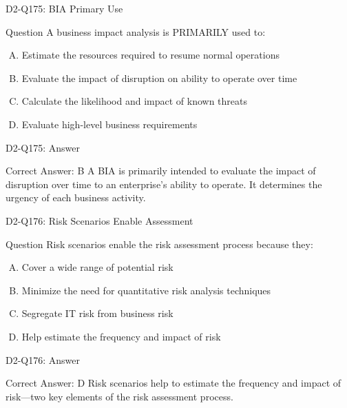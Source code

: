 \documentclass{beamer}
\begin{document}
	\begin{frame}{D2-Q175: BIA Primary Use}
		\begin{block}{Question}
			A business impact analysis is PRIMARILY used to:
		\end{block}
		\begin{enumerate}[(A)]
			\item Estimate the resources required to resume normal operations
			\item Evaluate the impact of disruption on ability to operate over time
			\item Calculate the likelihood and impact of known threats
			\item Evaluate high-level business requirements
		\end{enumerate}
	\end{frame}
	\begin{frame}{D2-Q175: Answer}
		\begin{block}{Correct Answer: B}
			A BIA is primarily intended to evaluate the impact of disruption over time to an enterprise's ability to operate. It determines the urgency of each business activity.
		\end{block}
	\end{frame}
	
	\begin{frame}{D2-Q176: Risk Scenarios Enable Assessment}
		\begin{block}{Question}
			Risk scenarios enable the risk assessment process because they:
		\end{block}
		\begin{enumerate}[(A)]
			\item Cover a wide range of potential risk
			\item Minimize the need for quantitative risk analysis techniques
			\item Segregate IT risk from business risk
			\item Help estimate the frequency and impact of risk
		\end{enumerate}
	\end{frame}
	\begin{frame}{D2-Q176: Answer}
		\begin{block}{Correct Answer: D}
			Risk scenarios help to estimate the frequency and impact of risk—two key elements of the risk assessment process.
		\end{block}
	\end{frame}
	
\end{document}
